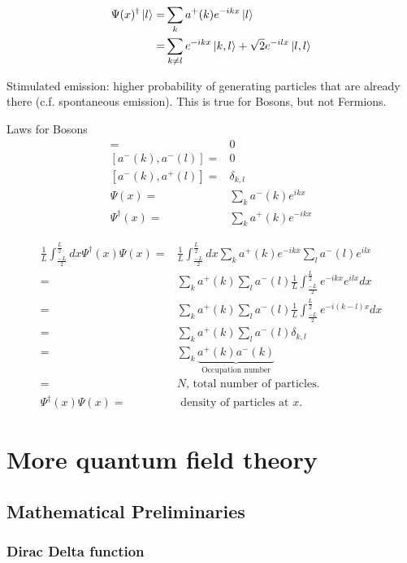 \documentclass[]{article}
\begin{document}
\begin{align*}
\Psi(x)^\dagger\ket{l} =& \sum_k a^+(k) e^{-ikx} \ket{l}\\
=& \sum_{k\ne l} e^{-ikx} \ket{k,l} + \sqrt{2} e^{-ilx} \ket{l,l}
\end{align*}

Stimulated emission: higher probability of generating particles that are already there (c.f. spontaneous emission). This is true for Bosons, but not Fermions.
 
 Laws for Bosons
 \begin{align*}
 [a^+(k),a^+(l)] =& 0\\
 [a^-(k),a^-(l)] =& 0\\
 [a^-(k),a^+(l)] =& \delta_{k,l}\\
 \Psi(x) =& \sum_k a^-(k) e^{ikx} \\
 \Psi^\dagger(x) =& \sum_k a^+(k) e^{-ikx}
 \end{align*}
 
 \begin{align*}
 \frac{1}{L}\int_\frac{-L}{2}^\frac{L}{2} dx \Psi^\dagger(x) \Psi(x) =& \frac{1}{L} \int_\frac{-L}{2}^\frac{L}{2} dx \sum_k a^+(k) e^{-ikx} \sum_l a^-(l) e^{ilx}\\
 =& \sum_k a^+(k) \sum_l a^-(l) \frac{1}{L} \int_\frac{-L}{2}^\frac{L}{2} e^{-ikx} e^{ilx} dx\\
 =& \sum_k a^+(k) \sum_l a^-(l) \frac{1}{L} \int_\frac{-L}{2}^\frac{L}{2} e^{-i(k-l)x} dx\\
  =& \sum_k a^+(k) \sum_l a^-(l) \delta_{k,l}\\
 =&  \sum_k \underbrace{a^+(k) a^-(k)}_\text{Occupation number}\\
 =& N \text{, total number of particles.}\\
 \Psi^\dagger(x) \Psi(x) =& \text{ density of particles at $x$}.
 \end{align*}


\section{More quantum field theory}

\subsection{Mathematical Preliminaries}

\subsubsection{Dirac Delta function}
\end{document}
